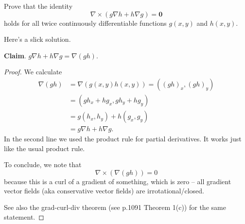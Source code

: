 \begin{problem}
  Prove that the identity
  \[\nabla\times(g\nabla h+h\nabla g)=\mathbf 0\]
  holds for all twice continuously differentiable functions $g(x,y)$ and $h(x,y)$.
\end{problem}
\begin{solution}
  Here's a slick solution.

  \textbf{Claim}. $g\nabla h+h\nabla g=\nabla(gh)$.
  \begin{proof}
    We calculate
    \[\begin{split}
      \nabla(gh) &= \nabla(g(x,y)h(x,y)) = \left((gh)_x,(gh)_y\right)\\
      &= \left(gh_x+hg_x,gh_y+hg_y\right)\\
      &= g(h_x,h_y)+h(g_x,g_y)\\
      &= g\nabla h+h\nabla g.
    \end{split}\]
    In the second line we used the product rule for partial derivatives. It works just like the usual product rule.

    To conclude, we note that
    \[\nabla\times(\nabla(gh))=0\]
    because this is a curl of a gradient of something, which is zero -- all gradient vector fields (aka conservative vector fields) are irrotational/closed.

    See also the grad-curl-div theorem (see p.1091 Theorem 1(c)) for the same statement.
  \end{proof}
\end{solution}

